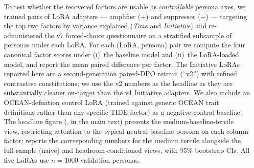 To test whether the recovered factors are usable as \emph{controllable} persona axes, we trained pairs of LoRA adapters --- amplifier ($+$) and suppressor ($-$) --- targeting the top two factors by variance explained (\textit{Tone} and \textit{Initiative}) and re-administered the v7 forced-choice questionnaire on a stratified subsample of personas under each LoRA.
For each (LoRA, persona) pair we compute the four canonical factor scores under (i)~the baseline model and (ii)~the LoRA-loaded model, and report the mean paired difference per factor.
The Initiative LoRAs reported here are a second-generation paired-DPO retrain (``v2'') with refined contrastive constitutions; we use the v2 numbers as the headline as they are substantially cleaner on-target than the v1 Initiative adapters.
We also include an OCEAN-definition control LoRA (trained against generic OCEAN trait definitions rather than any specific TIDE factor) as a negative-control baseline.
The headline figure (, in the main text) presents the medium-baseline-tercile view, restricting attention to the typical neutral-baseline persona on each column factor;  reports the corresponding numbers for the medium tercile alongside the full-sample (naive) and headroom-conditioned views, with 95\% bootstrap CIs.
All five LoRAs use $n=1000$ validation personas.

